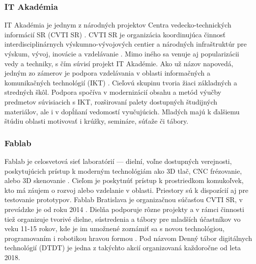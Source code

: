 \subsubsection*{IT Akadémia}
IT Akadémia je jednym z národných projektov Centra vedecko-technických informácií SR (CVTI SR) \cite{CVTISR-ITAkademia}. CVTI SR je organizácia koordinujúca činnosť interdisciplinárnych výskumno-vývojových centier a národných infraštruktúr pre výskum, vývoj, inovácie a vzdelávanie \cite{CVTISR}. Mimo iného sa venuje aj popularizácii vedy a techniky, s čím súvisí projekt IT Akadémie. Ako už názov napovedá, jedným zo zámerov je podpora vzdelávania v oblasti informačných a komunikačných technológií (IKT) \cite{ITAkademia}. Cieľovú skupinu tvoria žiaci základných a stredných škôl. Podpora spočíva v modernizácií obsahu a metód výučby predmetov súvisiacich s IKT, rozširovaní palety dostupných študijných materiálov, ale i v dopĺňaní vedomostí vyučujúcich. Mladých majú k ďalšiemu štúdiu oblasti motivovať i krúžky, semináre, súťaže či tábory.

\newpage
\subsubsection*{Fablab}
Fablab je celosvetová sieť laboratórií --- dielní, voľne dostupných verejnosti, poskytujúcich prístup k moderným technológiám ako 3D tlač, CNC frézovanie, alebo 3D skenovanie \cite{Fablab}. Cieľom je poskytnúť prístup k prostriedkom komukoľvek, kto má záujem o rozvoj alebo vzdelanie v oblasti. Priestory sú k dispozícií aj pre testovanie prototypov. Fablab Bratislava je organizačnou súčasťou CVTI SR, v prevádzke je od roku 2014 \cite{FablabVedeckyParkUK}. Dielňa podporuje rôzne projekty a v rámci činnosti tiež organizuje tvorivé dielne, sústredenia a tábory pre mladších účastníkov vo veku 11-15 rokov, kde je im umožnené zoznámiť sa s novou technológiou, programovaním i robotikou hravou formou \cite{FablabDTDT}. Pod názvom Denný tábor digitálnych technológií (DTDT) je jedna z takýchto akcií organizovaná každoročne od leta 2018.